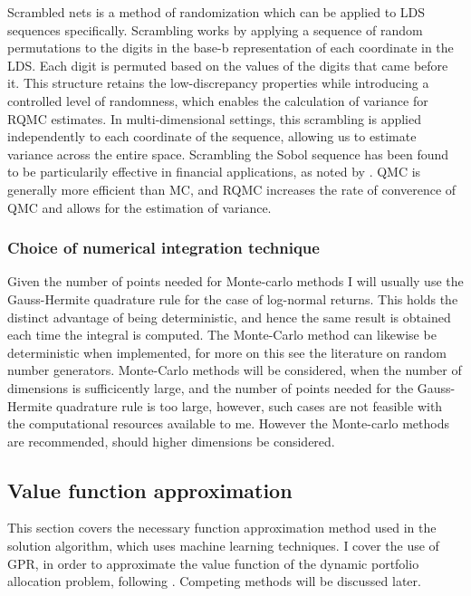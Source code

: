 \documentclass[11pt]{article}
\begin{document}
Scrambled nets is a method of randomization which can be applied to \ac{LDS} sequences specifically.
Scrambling works by applying a sequence of random permutations to the 
digits in the base-b representation of each coordinate in the \ac{LDS}.
Each digit is permuted based on the values of the digits that came before it. 
This structure retains the low-discrepancy properties 
while introducing a controlled level of randomness, 
which enables the calculation of variance for RQMC estimates.
In multi-dimensional settings, this scrambling is applied independently to each coordinate of the sequence, allowing us to estimate variance across the entire space.
Scrambling the Sobol sequence has been found to be particularily effective in financial applications,
as noted by \autocite{Scramble2023}. QMC is generally more efficient than MC, and RQMC increases the rate of converence of QMC
and allows for the estimation of variance.

\subsubsection{Choice of numerical integration technique} \label{Subsubsection: Choise_of_numerical_integration}
Given the number of points needed for Monte-carlo methods I will usually use the Gauss-Hermite quadrature rule for the case of log-normal returns.
This holds the distinct advantage of being deterministic, and hence the same result is obtained each time the integral is computed.
The Monte-Carlo method can likewise be deterministic when implemented, for more on this see the literature on random number generators.
Monte-Carlo methods will be considered, when the number of dimensions is sufficicently large, and the number of points needed for the Gauss-Hermite quadrature rule is too large,
however, such cases are not feasible with the computational resources available to me. However the Monte-carlo methods are recommended, should higher dimensions be considered.

\subsection{Value function approximation}
This section covers the necessary function approximation method used in the solution algorithm, which uses machine learning techniques.
I cover the use of \ac{GPR}, in order to approximate the value function of the dynamic portfolio allocation problem, following \autocite{Scheidegger2023}.
Competing methods will be discussed later.
\end{document}

